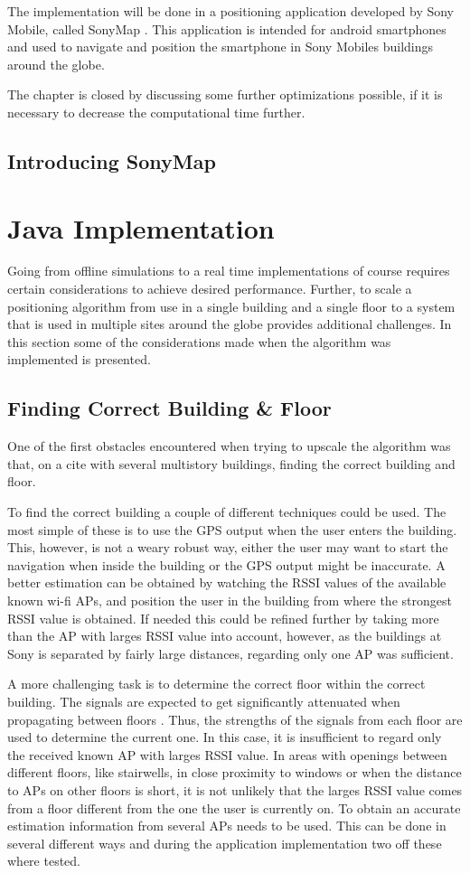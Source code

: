 \documentclass{LTHthesis}
\begin{document}
The implementation will be done in a positioning application developed by Sony Mobile, called SonyMap \cite{sonymap}. This application is intended for android smartphones and used to navigate and position the smartphone in Sony Mobiles buildings around the globe. 

The chapter is closed by discussing some further optimizations possible, if it is necessary to decrease the computational time further. 
%
\subsection{Introducing SonyMap}
%
\section{Java Implementation}
%
Going from offline simulations to a real time implementations of course requires certain considerations to achieve desired performance. Further, to scale a positioning algorithm from use in a single building and a single floor to a system that is used in multiple sites around the globe provides additional challenges. In this section some of the considerations made when the algorithm was implemented is presented. 
%
\subsection{Finding Correct Building \& Floor}
%
One of the first obstacles encountered when trying to upscale the algorithm was that, on a cite with several multistory buildings, finding the correct building and floor. 

To find the correct building a couple of different techniques could be used. The most simple of these is to use the GPS output when the user enters the building. This, however, is not a weary robust way, either the user may want to start the navigation when inside the building or the GPS output might be inaccurate. A better estimation can be obtained by watching the RSSI values of the available known wi-fi APs, and position the user in the building from where the strongest RSSI value is obtained. If needed this could be refined further by taking more than the AP with larges RSSI value into account, however, as the buildings at Sony is separated by fairly large distances, regarding only one AP was sufficient.

A more challenging task is to determine the correct floor within the correct building. The signals are expected to get significantly attenuated when propagating between floors \cite{rappaport96}. Thus, the strengths of the signals from each floor are used to determine the current one. In this case, it is insufficient to regard only the received known AP with larges RSSI value. In areas with openings between different floors, like stairwells, in close proximity to windows or when the distance to APs on other floors is short, it is not unlikely that the larges RSSI value comes from a floor different from the one the user is currently on. To obtain an accurate estimation information from several APs needs to be used. This can be done in several different ways and during the application implementation two off these where tested.
\end{document}
